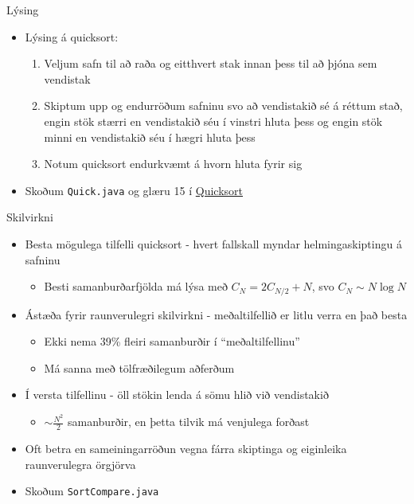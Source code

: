 \documentclass{beamer}
\begin{document}
\begin{frame}{Lýsing}
\begin{itemize}
 \item Lýsing á quicksort:
 \begin{enumerate}
  \item Veljum safn til að raða og eitthvert stak innan þess til að þjóna sem vendistak 
  \item Skiptum upp  og endurröðum safninu svo að vendistakið sé á réttum stað, engin stök stærri en vendistakið séu í vinstri hluta þess og engin stök minni en vendistakið séu í hægri hluta þess
  \item Notum quicksort endurkvæmt á hvorn hluta fyrir sig
 \end{enumerate}
 \item Skoðum \texttt{Quick.java} og glæru 15 í \href{http://algs4.cs.princeton.edu/lectures/23Quicksort.pdf}{Quicksort}
\end{itemize}
\end{frame}

\begin{frame}{Skilvirkni}
\begin{itemize}
 \item Besta mögulega tilfelli quicksort - hvert fallskall myndar helmingaskiptingu á safninu
 \begin{itemize}
  \item Besti samanburðarfjölda má lýsa með $C_N = 2C_{N/2} + N$, svo $C_N \sim N \log N$
 \end{itemize}
 \item Ástæða fyrir raunverulegri skilvirkni - meðaltilfellið er litlu verra en það besta
 \begin{itemize}
  \item Ekki nema 39\% fleiri samanburðir í ``meðaltilfellinu''
  \item Má sanna með tölfræðilegum aðferðum
 \end{itemize}
 \item Í versta tilfellinu - öll stökin lenda á sömu hlið við vendistakið
 \begin{itemize}
  \item $\sim \frac{N^2}{2}$ samanburðir, en þetta tilvik má venjulega forðast
 \end{itemize}
 \item Oft betra en sameiningarröðun vegna fárra skiptinga og eiginleika raunverulegra örgjörva
 \item Skoðum \texttt{SortCompare.java}
\end{itemize}
\end{frame}
\end{document}
